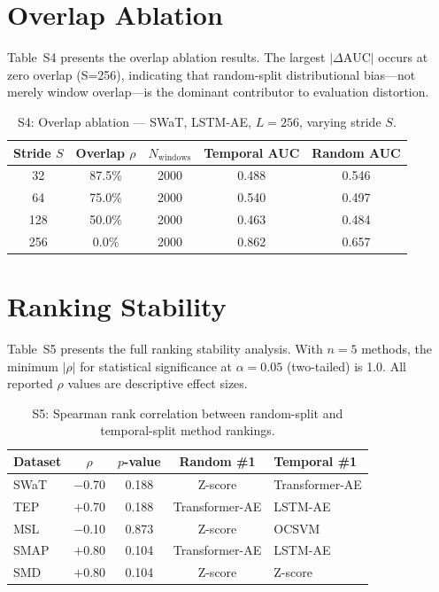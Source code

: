 \documentclass[12pt]{article}
\begin{document}
\section{Overlap Ablation}

Table~S4 presents the overlap ablation results. The largest $|\Delta\text{AUC}|$ occurs at zero overlap (S=256), indicating that random-split distributional bias---not merely window overlap---is the dominant contributor to evaluation distortion.

\begin{table}[htbp]
\centering
\caption{S4: Overlap ablation — SWaT, LSTM-AE, $L=256$, varying stride $S$.}
\begin{tabular}{ccccc}
\toprule
Stride $S$ & Overlap $\rho$ & $N_\text{windows}$ & Temporal AUC & Random AUC \\
\midrule
32  & 87.5\% & 2000 & 0.488 & 0.546 \\
64  & 75.0\% & 2000 & 0.540 & 0.497 \\
128 & 50.0\% & 2000 & 0.463 & 0.484 \\
256 & 0.0\%  & 2000 & 0.862 & 0.657 \\
\bottomrule
\end{tabular}
\end{table}

\section{Ranking Stability}

Table~S5 presents the full ranking stability analysis. With $n=5$ methods, the minimum $|\rho|$ for statistical significance at $\alpha=0.05$ (two-tailed) is 1.0. All reported $\rho$ values are descriptive effect sizes.

\begin{table}[htbp]
\centering
\caption{S5: Spearman rank correlation between random-split and temporal-split method rankings.}
\begin{tabular}{lcccl}
\toprule
Dataset & $\rho$ & $p$-value & Random \#1 & Temporal \#1 \\
\midrule
SWaT & $-$0.70 & 0.188 & Z-score & Transformer-AE \\
TEP  & $+$0.70 & 0.188 & Transformer-AE & LSTM-AE \\
MSL  & $-$0.10 & 0.873 & Z-score & OCSVM \\
SMAP & $+$0.80 & 0.104 & Transformer-AE & LSTM-AE \\
SMD  & $+$0.80 & 0.104 & Z-score & Z-score \\
\bottomrule
\end{tabular}
\end{table}
\end{document}
